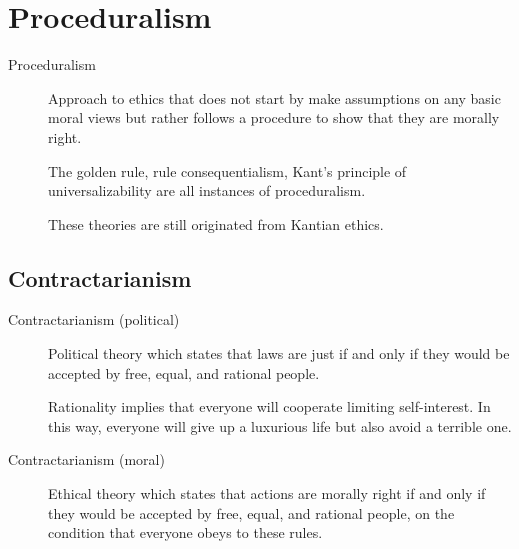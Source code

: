 \section{Proceduralism}

\begin{description}
    \item[Proceduralism] 
        Approach to ethics that does not start by make assumptions on any basic moral views but rather follows a procedure to show that they are morally right.

        \begin{remark}
            The golden rule, rule consequentialism, Kant's principle of universalizability are all instances of proceduralism.
        \end{remark}

        \begin{remark}
            These theories are still originated from Kantian ethics.
        \end{remark}
\end{description}


\subsection{Contractarianism}

\begin{description}
    \item[Contractarianism (political)] 
        Political theory which states that laws are just if and only if they would be accepted by free, equal, and rational people.

        \begin{remark}
            Rationality implies that everyone will cooperate limiting self-interest. In this way, everyone will give up a luxurious life but also avoid a terrible one.
        \end{remark}

    \item[Contractarianism (moral)] 
        Ethical theory which states that actions are morally right if and only if they would be accepted by free, equal, and rational people, on the condition that everyone obeys to these rules.
\end{description}

